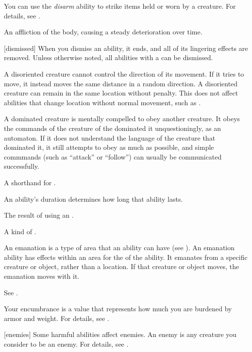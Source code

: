  You can use the \textit{disarm} ability to strike items held or worn by a creature.
For details, see .

 An affliction of the body, causing a steady deterioration over time.

[dismissed] When you dismiss an ability, it ends, and all of its lingering effects are removed.
Unless otherwise noted, all abilities with a  can be dismissed.

 A disoriented creature cannot control the direction of its movement.
If it tries to move, it instead moves the same distance in a random direction.
A disoriented creature can remain in the same location without penalty.
This does not affect abilities that change location without normal movement, such as .

 A dominated creature is mentally compelled to obey another creature.
It obeys the commands of the creature of the dominated it unquestioningly, as an automaton.
If it does not understand the language of the creature that dominated it, it still attempts to obey as much as possible, and simple commmands (such as ``attack'' or ``follow'') can usually be communicated successfully.

 A shorthand for .

 An ability's duration determines how long that ability lasts.

 The result of using an .

 A kind of .

 An emanation is a type of area that an ability can have (see ).
An emanation ability has effects within an area for the  of the ability.
It emanates from a specific creature or object, rather than a location.
If that creature or object moves, the emanation moves with it.

 See .

 Your encumbrance is a value that represents how much you are burdened by armor and weight.
For details, see .

[enemies] Some harmful abilities affect enemies.
An enemy is any creature you consider to be an enemy.
For details, see .


